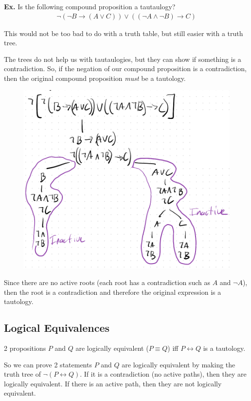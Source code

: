 \documentclass[12pt,letterpaper]{article} \usepackage{amsmath} \usepackage{graphicx}  \usepackage{longtable}  \usepackage{amssymb}
\begin{document}
        \begin{mdframed}
            \textbf{Ex. } Is the following compound proposition a tautaulogy?
            \begin{align*}
                \lnot(\lnot B \rightarrow (A \lor C))\lor ((\lnot A \land \lnot B)\rightarrow C)
            \end{align*}

            This would not be too bad to do with a truth table, but still easier with a truth tree.

            The trees do not help us with tautaulogies, but they can show if something is a contradiction. So, if the negation of our compound proposition is a contradiction, then the original compound proposition \emph{must} be a tautology. 

            \begin{figure}[H]
                \centering
                \includegraphics[width=0.7\linewidth]{ex3.png}
            \end{figure}

            Since there are no active roots (each root has a contradiction such as $A$ and $\lnot A$), then the root is a contradiction and therefore the original expression is a tautology.
        \end{mdframed}

        \subsection{Logical Equivalences}
        2 propositions $P$ and $Q$ are logically equivalent ($P \equiv Q$) iff $P\leftrightarrow Q$ is a tautology.

        So we can prove 2 statements $P$ and $Q$ are logically equivalent by making the truth tree of $\lnot (P \leftrightarrow Q)$. If it is a contradiction (no active paths), then they are logically equivalent. If there is an active path, then they are not logically equivalent. 
\end{document}
